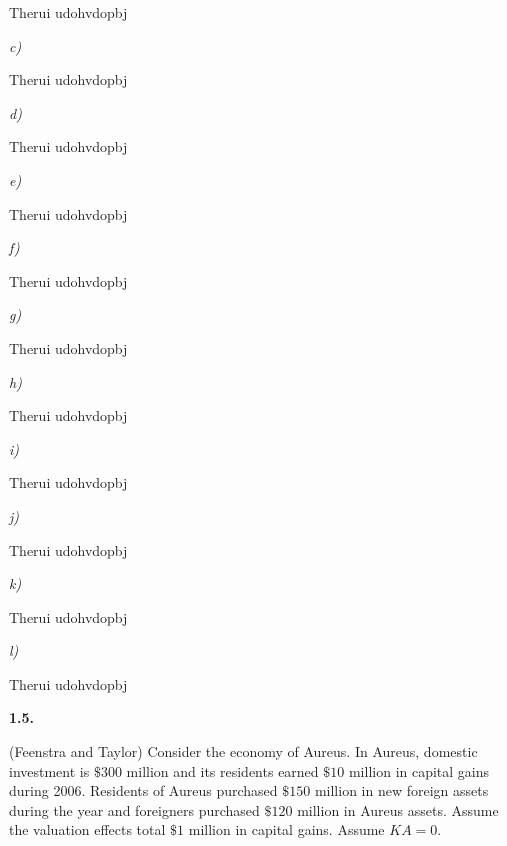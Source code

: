 \documentclass[11pt, a4paper]{article}
\begin{document}
\vspace{0.075in}
Therui udohvdopbj
\vspace{0.075in}

\textit{c)}

\vspace{0.075in}
Therui udohvdopbj
\vspace{0.075in}

\textit{d)}

\vspace{0.075in}
Therui udohvdopbj
\vspace{0.075in}

\textit{e)}

\vspace{0.075in}
Therui udohvdopbj
\vspace{0.075in}

\textit{f)}

\vspace{0.075in}
Therui udohvdopbj
\vspace{0.075in}

\textit{g)}

\vspace{0.075in}
Therui udohvdopbj
\vspace{0.075in}

\textit{h)}

\vspace{0.075in}
Therui udohvdopbj
\vspace{0.075in}

\textit{i)}

\vspace{0.075in}
Therui udohvdopbj
\vspace{0.075in}

\textit{j)}

\vspace{0.075in}
Therui udohvdopbj
\vspace{0.075in}

\textit{k)}

\vspace{0.075in}
Therui udohvdopbj
\vspace{0.075in}

\textit{l)}

\vspace{0.075in}
Therui udohvdopbj
\vspace{0.3in}

\clearpage

\textbf{1.5.}

(Feenstra and Taylor) Consider the economy of Aureus. In Aureus, domestic investment is $\$300$ million and its residents earned $\$10$ million in capital gains during 2006. Residents of Aureus purchased $\$150$ million in new foreign assets during the year and foreigners purchased $\$120$ million in Aureus assets. Assume the valuation effects total $\$1$ million in capital gains. Assume $KA = 0$.
\end{document}
